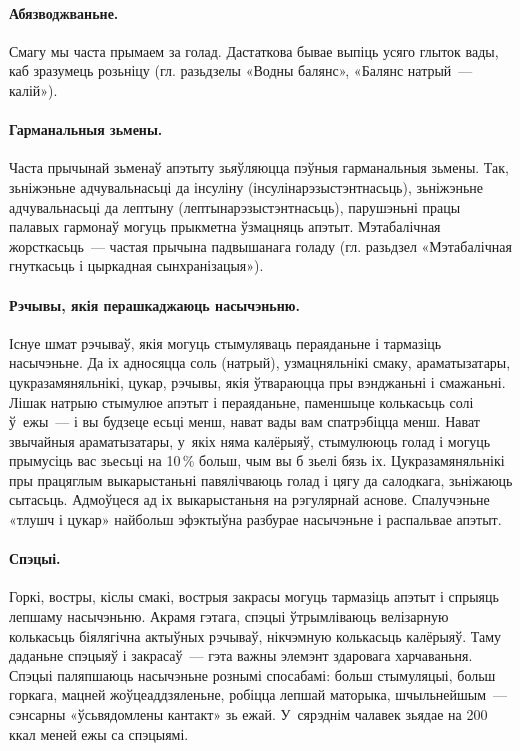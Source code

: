 \paragraph{Абязводжваньне.}
Смагу мы часта прымаем за голад. Дастаткова бывае выпіць усяго глыток вады, каб зразумець розьніцу (гл. разьдзелы «Водны балянс», «Балянс натрый~--- калій»).

\paragraph{Гарманальныя зьмены.}
Часта прычынай зьменаў апэтыту зьяўляюцца пэўныя гарманальныя зьмены. Так, зьніжэньне адчувальнасьці да інсуліну (інсулінарэзыстэнтнасьць), зьніжэньне адчувальнасьці да лептыну (лептынарэзыстэнтнасьць), парушэньні працы палавых гармонаў могуць прыкметна ўзмацняць апэтыт. Мэтабалічная жорсткасьць~--- частая прычына падвышанага голаду (гл. разьдзел «Мэтабалічная гнуткасьць і цыркадная сынхранізацыя»).

\paragraph{Рэчывы, якія перашкаджаюць насычэньню.}
Існуе шмат рэчываў, якія могуць стымуляваць пераяданьне і тармазіць насычэньне. Да іх адносяцца соль (натрый), узмацняльнікі смаку, араматызатары, цукразамяняльнікі, цукар, рэчывы, якія ўтвараюцца пры вэнджаньні і смажаньні. Лішак натрыю стымулюе апэтыт і пераяданьне, паменшыце колькасьць солі ў~ежы~--- і вы будзеце есьці менш, нават вады вам спатрэбіцца менш. Нават звычайныя араматызатары, у~якіх няма калёрыяў, стымулююць голад і могуць прымусіць вас зьесьці на 10\,\% больш, чым вы б зьелі бязь іх. Цукразамяняльнікі пры працяглым выкарыстаньні павялічваюць голад і цягу да салодкага, зьніжаюць сытасьць. Адмоўцеся ад іх выкарыстаньня на рэгулярнай аснове. Спалучэньне «тлушч і цукар» найбольш эфэктыўна разбурае насычэньне і распальвае апэтыт.

\paragraph{Спэцыі.}
Горкі, востры, кіслы смакі, вострыя закрасы могуць тармазіць апэтыт і спрыяць лепшаму насычэньню. Акрамя гэтага, спэцыі ўтрымліваюць велізарную колькасьць біялягічна актыўных рэчываў, нікчэмную колькасьць калёрыяў. Таму даданьне спэцыяў і закрасаў~--- гэта важны элемэнт здаровага харчаваньня. Спэцыі паляпшаюць насычэньне рознымі спосабамі: больш стымуляцыі, больш горкага, мацней жоўцеаддзяленьне, робіцца лепшай маторыка, шчыльнейшым~--- сэнсарны «ўсьвядомлены кантакт» зь ежай. У~сярэднім чалавек зьядае на 200\,ккал меней ежы са спэцыямі.

